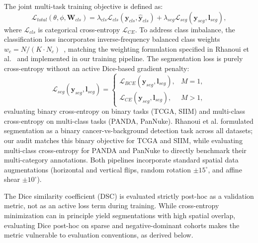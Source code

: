 \documentclass[preprint,12pt]{elsarticle}
\begin{document}
The joint multi-task training objective is defined as:
\begin{equation}
    \mathcal{L}_{total}(\theta, \phi, \mathbf{W}_{cls}) = \lambda_{cls} \mathcal{L}_{cls}(\mathbf{y}_{cls}, \hat{\mathbf{y}}_{cls}) + \lambda_{seg} \mathcal{L}_{seg}(\mathbf{y}_{seg}, \mathbf{l}_{seg}),
\end{equation}
where $\mathcal{L}_{cls}$ is categorical cross-entropy $\mathcal{L}_{CE}$. To address class imbalance, the classification loss incorporates inverse-frequency balanced class weights $w_c = N / (K \cdot N_c)$~\cite{pedregosa2011sklearn}, matching the weighting formulation specified in Rhanoui et al.~\cite{rhanoui2025multitask} and implemented in our training pipeline. The segmentation loss is purely cross-entropy without an active Dice-based gradient penalty:
\begin{equation}
    \mathcal{L}_{seg}(\mathbf{y}_{seg}, \mathbf{l}_{seg}) = 
    \begin{cases}
        \mathcal{L}_{BCE}(\mathbf{y}_{seg}, \mathbf{l}_{seg}), & M = 1, \\
        \mathcal{L}_{CE}(\mathbf{y}_{seg}, \mathbf{l}_{seg}), & M > 1,
    \end{cases}
\end{equation}
evaluating binary cross-entropy on binary tasks (TCGA, SIIM) and multi-class cross-entropy on multi-class tasks (PANDA, PanNuke). Rhanoui et al. formulated segmentation as a binary cancer-vs-background detection task across all datasets; our audit matches this binary objective for TCGA and SIIM, while evaluating multi-class cross-entropy for PANDA and PanNuke to directly benchmark their multi-category annotations. Both pipelines incorporate standard spatial data augmentations (horizontal and vertical flips, random rotation $\pm 15^\circ$, and affine shear $\pm 10^\circ$).

The Dice similarity coefficient (DSC) is evaluated strictly post-hoc as a validation metric, not as an active loss term during training. While cross-entropy minimization can in principle yield segmentations with high spatial overlap, evaluating Dice post-hoc on sparse and negative-dominant cohorts makes the metric vulnerable to evaluation conventions, as derived below.
\end{document}
